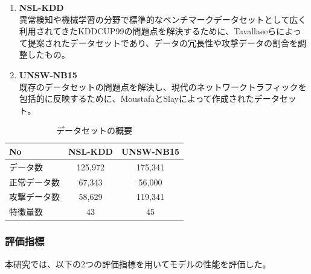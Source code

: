 \documentclass{css}
\begin{document}
\begin{enumerate}
    \item \textbf{NSL-KDD}\\
        異常検知や機械学習の分野で標準的なベンチマークデータセットとして広く利用されてきたKDDCUP99\cite{KDDCUP99}の問題点を解決するために、Tavallaeeらによって提案されたデータセットであり、データの冗長性や攻撃データの割合を調整したもの\cite{Tavallaee2009-we}。
    \item \textbf{UNSW-NB15}\\
        既存のデータセットの問題点を解決し、現代のネットワークトラフィックを包括的に反映するために、MoustafaとSlayによって作成されたデータセット\cite{Moustafa2015-cg}。
\end{enumerate}

\begin{table}[h]
    \centering
    \caption{データセットの概要}\label{tab:data1}
    \begin{tabular}{lcc}
    \hline\hline
    No & NSL-KDD & UNSW-NB15 \\
    \hline
    データ数 & 125,972 & 175,341 \\
    正常データ数 & 67,343 & 56,000 \\
    攻撃データ数 & 58,629 & 119,341 \\
    特徴量数 & 43 & 45 \\
    \hline
    \end{tabular}
\end{table}

\subsubsection{評価指標}
本研究では、以下の2つの評価指標を用いてモデルの性能を評価した。
\end{document}
